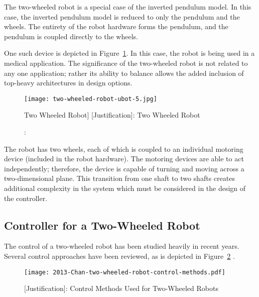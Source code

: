 \documentclass[crop=false,float=true,class=scrartcl]{standalone}
\begin{document}
The two-wheeled robot is a special case of the inverted pendulum model.
In this case, the inverted pendulum model is reduced to only the pendulum and the wheels.
The entirety of the robot hardware forms the pendulum, and
the pendulum is coupled directly to the wheels.

One such device is depicted in Figure~\ref{FIG:justification:ubot5}.
In this case, the robot is being used in a medical application.
The significance of the two-wheeled robot is not related to any one application; rather
its ability to balance allows the added inclusion of top-heavy architectures in design options.

\vspace*{+2em}
\begin{figure}[H]
\centering
\texttt{[image: two-wheeled-robot-ubot-5.jpg]}
\caption[[Justification]: Two Wheeled Robot]
        {[Justification]: Two Wheeled Robot\footnotemark}
\label{FIG:justification:ubot5}
\end{figure}
\vspace*{+0em}



The robot has two wheels, each of which is coupled to an individual motoring device {\fns(included in the robot hardware)}.
The motoring devices are able to act independently; therefore,
the device is capable of turning and moving across a two-dimensional plane.
This transition from one shaft to two shafts creates additional complexity in the system
which must be considered in the design of the controller.




\subsection{Controller for a Two-Wheeled Robot}
\label{SEC:justification:twoWheeledRobot:controller}

The control of a two-wheeled robot has been studied heavily in recent years. 
Several control approaches have been reviewed, 
as is depicted in Figure~\ref{FIG:justification:controlMethods} \cite{REF:Article:2013-Chan}.

\vspace*{+2em}
\begin{figure}[H]
\centering
\texttt{[image: 2013-Chan-two-wheeled-robot-control-methods.pdf]}
\caption{[Justification]: Control Methods Used for Two-Wheeled Robots}
\label{FIG:justification:controlMethods}
\end{figure}
\vspace*{+0em}
\end{document}
